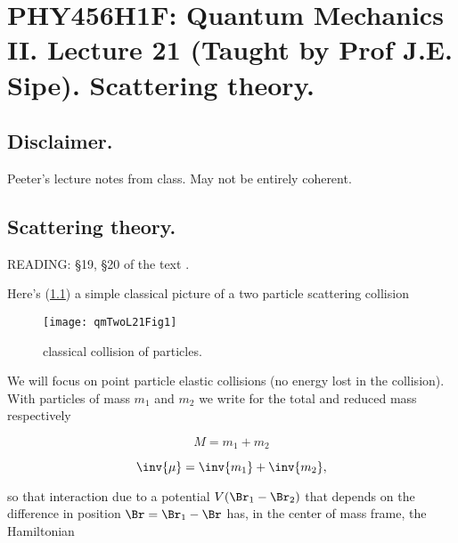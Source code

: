 
%

\chapter{PHY456H1F: Quantum Mechanics II.  Lecture 21 (Taught by Prof J.E. Sipe).  Scattering theory.}
\label{chap:qmTwoL21}
{}
\date{Nov 23, 2011}

\beginArtWithToc

\section{Disclaimer.}

Peeter's lecture notes from class.  May not be entirely coherent.

\section{Scattering theory.}

READING: \S 19, \S 20 of the text \cite{desai2009quantum}.

Here's (\ref{fig:qmTwoL21:qmTwoL21Fig1}) a simple classical picture of a two particle scattering collision

\begin{figure}[htp]
   \centering
   \texttt{[image: qmTwoL21Fig1]}
   \caption{classical collision of particles.}\label{fig:qmTwoL21:qmTwoL21Fig1}
\end{figure}

We will focus on point particle elastic collisions (no energy lost in the collision).  With particles of mass $m_1$ and $m_2$ we write for the total and reduced mass respectively

\begin{equation}\label{eqn:qmTwoL21:n}
M = m_1 + m_2
\end{equation}

\begin{equation}\label{eqn:qmTwoL21:n}
\inv{\mu} = \inv{m_1} + \inv{m_2},
\end{equation}

so that interaction due to a potential $V(\Br_1 - \Br_2)$ that depends on the difference in position $\Br = \Br_1 - \Br$ has, in the center of mass frame, the Hamiltonian

